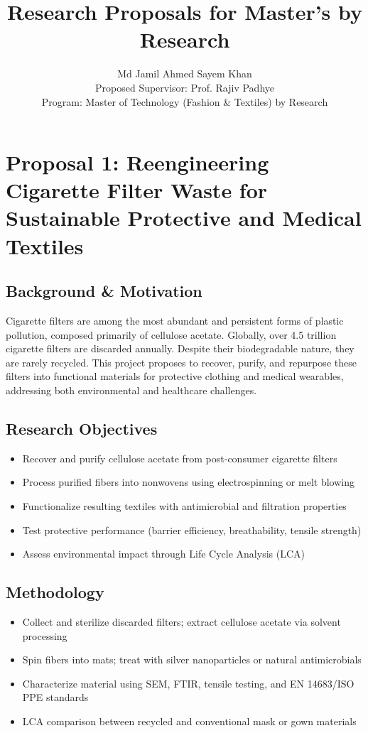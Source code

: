 \documentclass[12pt]{article}
\title{\bfseries Research Proposals for Master's by Research\vspace{-2ex}}
\author{\normalsize Md Jamil Ahmed Sayem Khan \\ \normalsize Proposed Supervisor: Prof. Rajiv Padhye \\ \normalsize Program: Master of Technology (Fashion \& Textiles) by Research}
\date{}
\begin{document}
\maketitle
\thispagestyle{fancy}

\section*{Proposal 1: Reengineering Cigarette Filter Waste for Sustainable Protective and Medical Textiles}

\subsection*{Background \& Motivation}
Cigarette filters are among the most abundant and persistent forms of plastic pollution, composed primarily of cellulose acetate. Globally, over 4.5 trillion cigarette filters are discarded annually. Despite their biodegradable nature, they are rarely recycled. This project proposes to recover, purify, and repurpose these filters into functional materials for protective clothing and medical wearables, addressing both environmental and healthcare challenges.

\subsection*{Research Objectives}
\begin{itemize}[noitemsep]
    \item Recover and purify cellulose acetate from post-consumer cigarette filters
    \item Process purified fibers into nonwovens using electrospinning or melt blowing
    \item Functionalize resulting textiles with antimicrobial and filtration properties
    \item Test protective performance (barrier efficiency, breathability, tensile strength)
    \item Assess environmental impact through Life Cycle Analysis (LCA)
\end{itemize}

\subsection*{Methodology}
\begin{itemize}[noitemsep]
    \item Collect and sterilize discarded filters; extract cellulose acetate via solvent processing
    \item Spin fibers into mats; treat with silver nanoparticles or natural antimicrobials
    \item Characterize material using SEM, FTIR, tensile testing, and EN 14683/ISO PPE standards
    \item LCA comparison between recycled and conventional mask or gown materials
\end{itemize}
\end{document}
